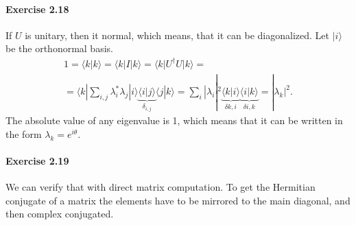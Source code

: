\documentclass[a4paper,12pt]{article}
\newcommand{\exercise}[1]{\paragraph{Exercise #1}}
\newcommand{\la}{\langle}
\newcommand{\ra}{\rangle}
\begin{document}
    \exercise{2.18} If $U$ is unitary, then it normal, which means, that it can be diagonalized. Let $| i \ra$ be the orthonormal basis.
    \begin{gather}
        \nonumber
        1 = \la k | k \ra = \la k | I | k \ra = \la k | U^\dagger U | k \ra = \\
        = \la k | \sum_{i, j} \lambda_i^* \lambda_j | i \ra \underbrace{\la i | j \ra}_{\delta_{i, j}} \la j | k \ra
        = \sum_i | \lambda_i |^2 \underbrace{\la k | i \ra}_{\delta{k, i}} \underbrace{\la i | k \ra}_{\delta{i, k}} = | \lambda_k |^2 \textrm{.}
    \end{gather}
    The absolute value of any eigenvalue is 1, which means that it can be written in the form $\lambda_k = e^{i \theta}$.

    \exercise{2.19} We can verify that with direct matrix computation. To get the Hermitian conjugate of a matrix the elements have to be mirrored to the main diagonal, and then complex conjugated.
\end{document}
